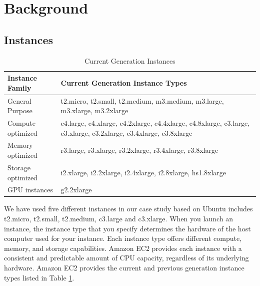 \documentclass[10pt, conference]{IEEEtran}
\begin{document}
\section{Background}
\label{sec:backgr-relat-work}

\subsection{Instances}
\begin{table}
\begin{center}
\begin{tabular}{|l|l| }
  \hline
  Instance Family & Current Generation Instance Types \\
  \hline
  General Purpose & t2.micro, t2.small, t2.medium,  m3.medium, m3.large, m3.xlarge, m3.2xlarge \\
  Compute optimized &  c4.large, c4.xlarge, c4.2xlarge, c4.4xlarge, c4.8xlarge, c3.large,  c3.xlarge, c3.2xlarge, c3.4xlarge, c3.8xlarge\\
  Memory optimized & r3.large, r3.xlarge, r3.2xlarge, r3.4xlarge, r3.8xlarge \\
  Storage optimized & i2.xlarge, i2.2xlarge, i2.4xlarge, i2.8xlarge, hs1.8xlarge \\
  GPU instances & g2.2xlarge \\
  \hline
\end{tabular}
\caption{\label{table:instancess} Current Generation Instances}
\end{center}
\end{table}


We have used five different instances in our case study based on Ubuntu includes t2.micro, t2.small, t2.medium, c3.large and c3.xlarge. When you launch an instance, the instance type that you specify determines the hardware of the host computer used for your instance. Each instance type offers different compute, memory, and storage capabilities. Amazon EC2 provides each instance with a consistent and predictable amount of CPU capacity, regardless of its underlying hardware. Amazon EC2 provides the current and previous generation instance types listed in Table \ref{table:instancess}.  
\end{document}
